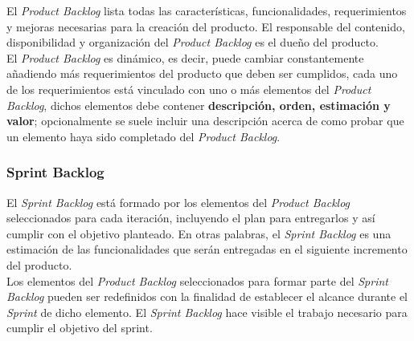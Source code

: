  El {\it Product Backlog} lista todas las características, funcionalidades, requerimientos y
 mejoras necesarias para la creación del producto. El responsable del contenido, disponibilidad
 y organización del {\it Product Backlog} es el dueño del producto.\\

 \noindent El {\it Product Backlog} es dinámico, es decir, puede cambiar constantemente
 añadiendo más requerimientos del producto que deben ser cumplidos, cada uno de los requerimientos
 está vinculado con uno o más elementos del {\it Product Backlog}, dichos elementos debe contener
 {\bf descripción, orden, estimación y valor}; opcionalmente se suele incluir una descripción
 acerca de como probar que un elemento haya sido completado del {\it Product Backlog}.

\subsubsection{Sprint Backlog}

 El {\it Sprint Backlog} está formado por los elementos del {\it Product Backlog} seleccionados
 para cada iteración, incluyendo el plan para entregarlos y así cumplir con el objetivo planteado.
 En otras palabras, el {\it Sprint Backlog} es una estimación de las funcionalidades que serán
 entregadas en el siguiente incremento del producto.\\

 \noindent Los elementos del {\it Product Backlog} seleccionados para formar parte del {\it Sprint
 Backlog} pueden ser redefinidos con la finalidad de establecer el alcance durante el {\it Sprint}
 de dicho elemento. El {\it Sprint Backlog} hace visible el trabajo necesario para cumplir el
 objetivo del sprint.

\clearpage

